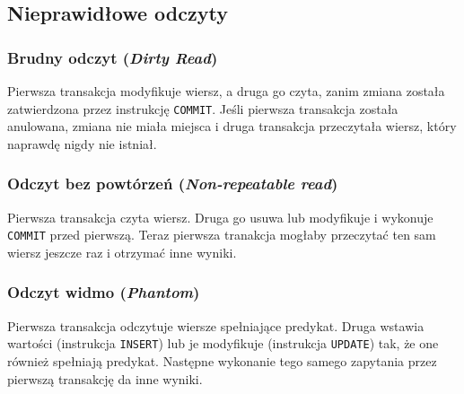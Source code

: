 \documentclass{article}
\begin{document}
\subsection{Nieprawidłowe odczyty}
\subsubsection{Brudny odczyt (\emph{Dirty Read})}
Pierwsza transakcja modyfikuje wiersz, a druga go czyta, zanim zmiana została zatwierdzona przez instrukcję \texttt{COMMIT}. Jeśli pierwsza transakcja została anulowana, zmiana nie miała miejsca i druga transakcja przeczytała wiersz, który naprawdę nigdy nie istniał.
\subsubsection{Odczyt bez powtórzeń (\emph{Non-repeatable read})}
Pierwsza transakcja czyta wiersz. Druga go usuwa lub modyfikuje i wykonuje \texttt{COMMIT} przed pierwszą. Teraz pierwsza tranakcja mogłaby przeczytać ten sam wiersz jeszcze raz i otrzymać inne wyniki.
\subsubsection{Odczyt widmo (\emph{Phantom})}
Pierwsza transakcja odczytuje wiersze spełniające predykat. Druga wstawia wartości (instrukcja \texttt{INSERT}) lub je modyfikuje (instrukcja \texttt{UPDATE}) tak, że one również spełniają predykat. Następne wykonanie tego samego zapytania przez pierwszą transakcję da inne wyniki.
\begin{table}
    \centering
    \caption{Poziomy izolacji i dozwolone odczyty}
    \label{poziomy-izolacji}
    \end{table}
\end{document}
